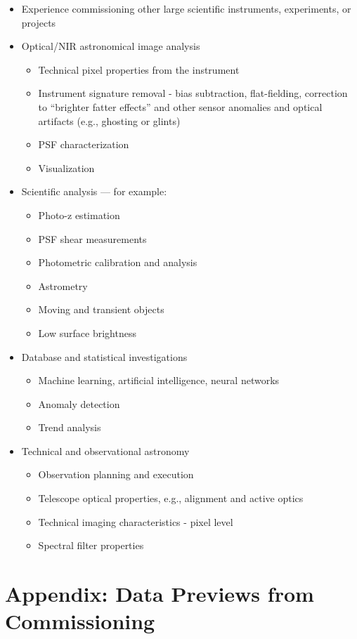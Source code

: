\documentclass[SE,authoryear,toc]{lsstdoc}
\begin{document}
\begin{itemize}
\item Experience commissioning other large scientific instruments, experiments, or projects
\item Optical/NIR astronomical image analysis
	\begin{itemize}
	\item Technical pixel properties from the instrument
	\item Instrument signature removal - bias subtraction, flat-fielding, correction to ``brighter fatter effects'' and other sensor anomalies and optical artifacts (e.g., ghosting or glints)
	\item PSF characterization
	\item Visualization
	\end{itemize}
\item Scientific analysis --- for example:
\begin{itemize}
	\item Photo-z estimation
	\item PSF shear measurements
	\item Photometric calibration and analysis
	\item Astrometry
	\item Moving and transient objects
	\item Low surface brightness
\end{itemize}
\item Database and statistical investigations
	\begin{itemize}
	\item Machine learning, artificial intelligence, neural networks
	\item Anomaly detection
	\item Trend analysis
\end{itemize}
\item Technical and observational astronomy
	\begin{itemize}
	\item Observation planning and execution
	\item Telescope optical properties, e.g., alignment and active optics
	\item Technical imaging characteristics - pixel level
	\item Spectral filter properties
	\end{itemize}
\end{itemize}

\appendix

\section{Appendix: Data Previews from Commissioning}
\label{data_previews}
\end{document}
